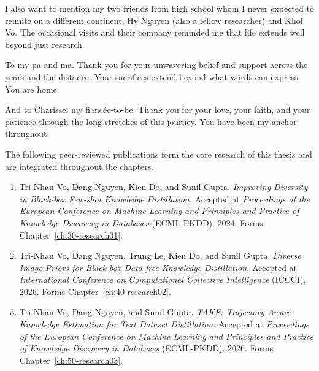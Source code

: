 \documentclass[12pt, a4paper, twoside]{book}
\numberwithin{equation}{chapter}
\theoremstyle{plain}
\theoremstyle{definition}
\theoremstyle{remark}
\newenvironment{foldable}{}{}
\newcommand{\frontmattersection}[1]{\newpage\thispagestyle{empty}\noindent{\bfseries \Large #1 \par}\vspace{2em}}
\begin{document}
\begin{foldable}
  I also want to mention my two friends from high school whom I never expected to reunite on a different continent, Hy Nguyen (also a fellow researcher) and Khoi Vo.
  The occasional visits and their company reminded me that life extends well beyond just research.
\end{foldable}

\begin{foldable}
  To my pa and ma.
  Thank you for your unwavering belief and support across the years and the distance.
  Your sacrifices extend beyond what words can express.
  You are home.
\end{foldable}

\begin{foldable}
  And to Charisse, my fiancée-to-be.
  Thank you for your love, your faith, and your patience through the long stretches of this journey.
  You have been my anchor throughout.
\end{foldable}

\frontmattersection{List of Publications}

The following peer-reviewed publications form the core research of this thesis and are integrated throughout the chapters.

\begin{enumerate}
  \item {
      Tri-Nhan Vo, Dang Nguyen, Kien Do, and Sunil Gupta.
      \textit{Improving Diversity in Black-box Few-shot Knowledge Distillation.}
      Accepted at \textit{Proceedings of the European Conference on Machine Learning and Principles and Practice of Knowledge Discovery in Databases} (ECML-PKDD), 2024.
      Forms Chapter~\ref{ch:30-research01}.
    }
  \item {
      Tri-Nhan Vo, Dang Nguyen, Trung Le, Kien Do, and Sunil Gupta.
      \textit{Diverse Image Priors for Black-box Data-free Knowledge Distillation.}
      Accepted at \textit{International Conference on Computational Collective Intelligence} (ICCCI), 2026.
      Forms Chapter~\ref{ch:40-research02}.
    }
  \item {
      Tri-Nhan Vo, Dang Nguyen, and Sunil Gupta.
      \textit{TAKE: Trajectory-Aware Knowledge Estimation for Text Dataset Distillation.}
      Accepted at \textit{Proceedings of the European Conference on Machine Learning and Principles and Practice of Knowledge Discovery in Databases} (ECML-PKDD), 2026.
      Forms Chapter~\ref{ch:50-research03}.
    }
\end{enumerate}
\end{document}
